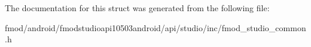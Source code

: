The documentation for this struct was generated from the following file\+:\begin{DoxyCompactItemize}
\item 
fmod/android/fmodstudioapi10503android/api/studio/inc/fmod\+\_\+studio\+\_\+common.\+h\end{DoxyCompactItemize}
